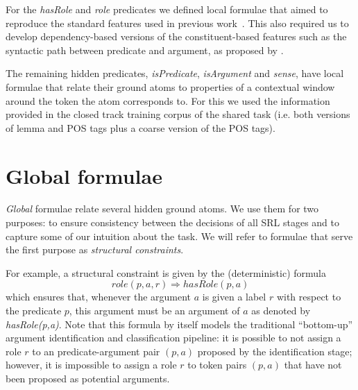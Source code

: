 For the \emph{hasRole} and \emph{role} predicates we defined local formulae that aimed to reproduce the standard features used in previous work~\citep{xue04calibrating}. This also required us to develop dependency-based versions of the constituent-based features such as the syntactic path between predicate and argument, as proposed by \cite{xue04calibrating}. 

The remaining hidden predicates, \emph{isPredicate}, \emph{isArgument} and \emph{sense}, have local formulae that relate their ground atoms to properties of a contextual window around the token the atom corresponds to. For this we used the information provided in the closed track training corpus of the shared task (i.e. both versions of lemma and POS tags plus a coarse version of the POS tags). 





\section{Global formulae}

\emph{Global} formulae relate several hidden ground atoms. We use them for two purposes: to ensure consistency between the decisions of all SRL stages and to capture some of our intuition about the task. We will refer to formulae that serve the first purpose as \emph{structural constraints}. 

For example, a structural constraint is given by the (deterministic) formula
\[role(p,a,r) \Rightarrow hasRole(p,a)\]
which ensures that, whenever the argument $a$ is given a label $r$ with respect to the predicate $p$, this argument must be an argument of $a$ as denoted by \emph{hasRole(p,a)}. Note that this formula by itself models the traditional ``bottom-up'' argument identification and classification pipeline: it is possible to not assign a role $r$ to an predicate-argument pair $(p,a)$ proposed by the identification stage; however, it is impossible to assign a role $r$ to token pairs $(p,a)$ that have not been proposed as potential arguments.

